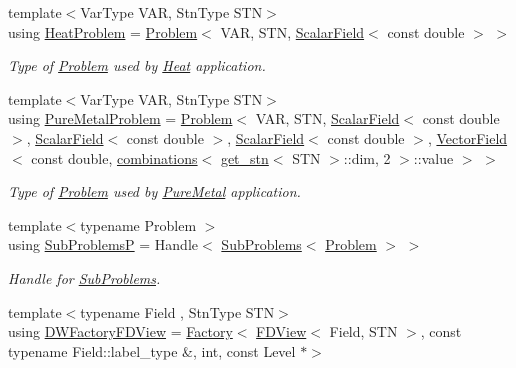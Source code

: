 \begin{DoxyCompactItemize}
{\footnotesize template$<$Var\+Type V\+AR, Stn\+Type S\+TN$>$ }\\using \hyperlink{namespaceUintah_1_1PhaseField_af786d8e2489272b1c6903a1377df1f1b}{Heat\+Problem} = \hyperlink{classUintah_1_1PhaseField_1_1Problem}{Problem}$<$ V\+AR, S\+TN, \hyperlink{structUintah_1_1PhaseField_1_1ScalarField}{Scalar\+Field}$<$ const double $>$ $>$
\begin{DoxyCompactList}\small\item\em Type of \hyperlink{classUintah_1_1PhaseField_1_1Problem}{Problem} used by \hyperlink{classUintah_1_1PhaseField_1_1Heat}{Heat} application. \end{DoxyCompactList}\item 
{\footnotesize template$<$Var\+Type V\+AR, Stn\+Type S\+TN$>$ }\\using \hyperlink{namespaceUintah_1_1PhaseField_a8b672bdd087de9e7387512bfe7c7d3a4}{Pure\+Metal\+Problem} = \hyperlink{classUintah_1_1PhaseField_1_1Problem}{Problem}$<$ V\+AR, S\+TN, \hyperlink{structUintah_1_1PhaseField_1_1ScalarField}{Scalar\+Field}$<$ const double $>$, \hyperlink{structUintah_1_1PhaseField_1_1ScalarField}{Scalar\+Field}$<$ const double $>$, \hyperlink{structUintah_1_1PhaseField_1_1ScalarField}{Scalar\+Field}$<$ const double $>$, \hyperlink{structUintah_1_1PhaseField_1_1VectorField}{Vector\+Field}$<$ const double, \hyperlink{structUintah_1_1PhaseField_1_1combinations}{combinations}$<$ \hyperlink{structUintah_1_1PhaseField_1_1get__stn}{get\+\_\+stn}$<$ S\+TN $>$\+::dim, 2 $>$\+::value $>$ $>$
\begin{DoxyCompactList}\small\item\em Type of \hyperlink{classUintah_1_1PhaseField_1_1Problem}{Problem} used by \hyperlink{classUintah_1_1PhaseField_1_1PureMetal}{Pure\+Metal} application. \end{DoxyCompactList}\item 
{\footnotesize template$<$typename Problem $>$ }\\using \hyperlink{namespaceUintah_1_1PhaseField_acb95bc634a12aa4120b33fbe933f24bd}{Sub\+ProblemsP} = Handle$<$ \hyperlink{structUintah_1_1PhaseField_1_1SubProblems}{Sub\+Problems}$<$ \hyperlink{classUintah_1_1PhaseField_1_1Problem}{Problem} $>$ $>$
\begin{DoxyCompactList}\small\item\em Handle for \hyperlink{structUintah_1_1PhaseField_1_1SubProblems}{Sub\+Problems}. \end{DoxyCompactList}\item 
{\footnotesize template$<$typename Field , Stn\+Type S\+TN$>$ }\\using \hyperlink{namespaceUintah_1_1PhaseField_a142a97025a09cbbe9f5a53455a9f32a9}{D\+W\+Factory\+F\+D\+View} = \hyperlink{classUintah_1_1PhaseField_1_1Factory}{Factory}$<$ \hyperlink{namespaceUintah_1_1PhaseField_a63032464b1cd54eaa53c1c29109746ac}{F\+D\+View}$<$ Field, S\+TN $>$, const typename Field\+::label\+\_\+type \&, int, const Level $\ast$$>$
$$
\end{DoxyCompactItemize}
